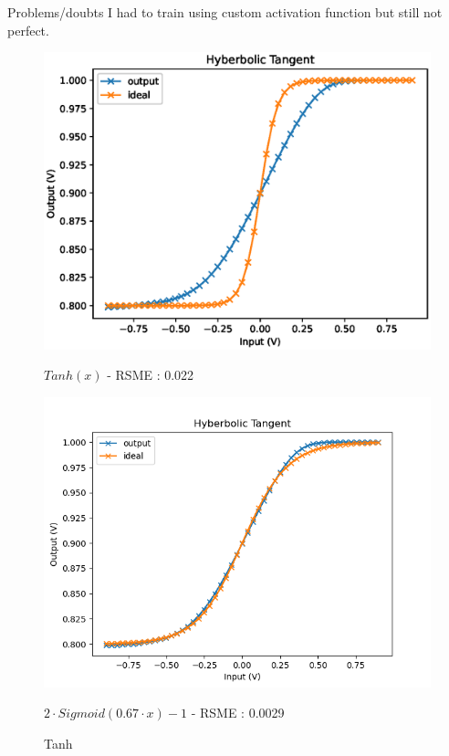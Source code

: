 \documentclass[table]{beamer}
\begin{document}
  \begin{frame}{Problems/doubts}
    I had to train using custom activation function but still not perfect.
    \begin{figure}[!tbp]
      \centering
      \begin{minipage}[b]{0.4\textwidth}
        \centering
        \includegraphics[width=\textwidth]{activation/tanh}
        \caption{ $ Tanh(x) $ - RSME : 0.022}
      \end{minipage}
      \hspace{20pt}
      \begin{minipage}[b]{0.4\textwidth}
        \centering
        \includegraphics[width=\textwidth]{activation/cTanh}
        \caption{ $2\cdot Sigmoid(0.67\cdot x)-1$ - RSME : 0.0029}
      \end{minipage}
      \caption{Tanh}
    \end{figure}
  \end{frame}
\end{document}
